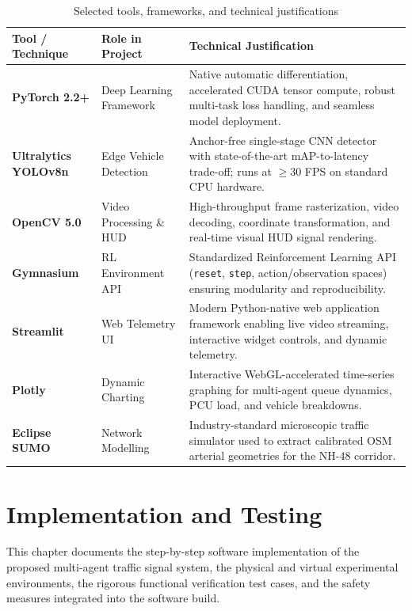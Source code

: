 \documentclass[12pt,a4paper,oneside]{report}
\begin{document}
\begin{table}[htbp]
\centering
\small
\caption{Selected tools, frameworks, and technical justifications}
\label{tab:selected_tools}
\begin{tabularx}{\textwidth}{|p{3.0cm}|p{3.2cm}|X|}
\hline
\textbf{Tool / Technique} & \textbf{Role in Project} & \textbf{Technical Justification} \\ \hline
\textbf{PyTorch 2.2+} & Deep Learning Framework & Native automatic differentiation, accelerated CUDA tensor compute, robust multi-task loss handling, and seamless model deployment. \\ \hline
\textbf{Ultralytics YOLOv8n} & Edge Vehicle Detection & Anchor-free single-stage CNN detector with state-of-the-art mAP-to-latency trade-off; runs at $\ge 30$ FPS on standard CPU hardware. \\ \hline
\textbf{OpenCV 5.0} & Video Processing \& HUD & High-throughput frame rasterization, video decoding, coordinate transformation, and real-time visual HUD signal rendering. \\ \hline
\textbf{Gymnasium} & RL Environment API & Standardized Reinforcement Learning API (\texttt{reset}, \texttt{step}, action/observation spaces) ensuring modularity and reproducibility. \\ \hline
\textbf{Streamlit} & Web Telemetry UI & Modern Python-native web application framework enabling live video streaming, interactive widget controls, and dynamic telemetry. \\ \hline
\textbf{Plotly} & Dynamic Charting & Interactive WebGL-accelerated time-series graphing for multi-agent queue dynamics, PCU load, and vehicle breakdowns. \\ \hline
\textbf{Eclipse SUMO} & Network Modelling & Industry-standard microscopic traffic simulator used to extract calibrated OSM arterial geometries for the NH-48 corridor. \\ \hline
\end{tabularx}
\end{table}

\chapter{Implementation and Testing}
\label{ch:impl_testing}

This chapter documents the step-by-step software implementation of the proposed multi-agent traffic signal system, the physical and virtual experimental environments, the rigorous functional verification test cases, and the safety measures integrated into the software build.
\end{document}
